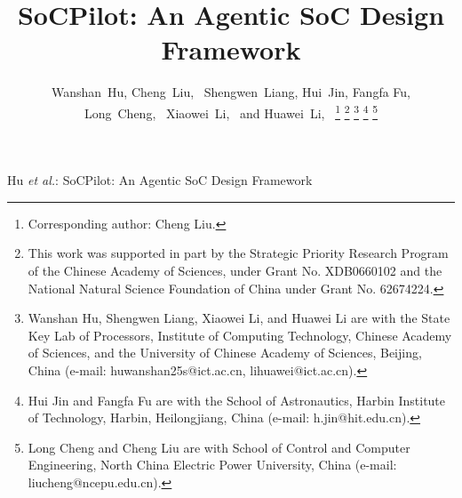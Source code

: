 \title{SoCPilot: An Agentic SoC Design Framework}

\author{Wanshan~Hu, Cheng~Liu,~
Shengwen~Liang, Hui~Jin, Fangfa Fu, \\
Long~Cheng,~
Xiaowei~Li,~
and Huawei~Li,~%
\thanks{Corresponding author: Cheng Liu.}
\thanks{This work was supported in part by the Strategic Priority Research Program of the Chinese Academy of Sciences, under Grant No. XDB0660102 and the National Natural Science Foundation of China under Grant No. 62674224.}
\thanks{Wanshan Hu, Shengwen Liang, Xiaowei Li, and Huawei Li are with the State Key Lab of Processors, Institute of Computing Technology, Chinese Academy of Sciences, and the University of Chinese Academy of Sciences, Beijing, China (e-mail: huwanshan25s@ict.ac.cn, lihuawei@ict.ac.cn).}%
\thanks{Hui Jin and Fangfa Fu are with the School of Astronautics, Harbin Institute of Technology, Harbin, Heilongjiang, China (e-mail: h.jin@hit.edu.cn).}%
\thanks{Long Cheng and Cheng Liu are with School of Control and Computer Engineering, North China Electric Power University, China (e-mail: liucheng@ncepu.edu.cn).}%
}

%
{Hu \MakeLowercase{\textit{et al.}}: SoCPilot: An Agentic SoC Design Framework}

\maketitle

